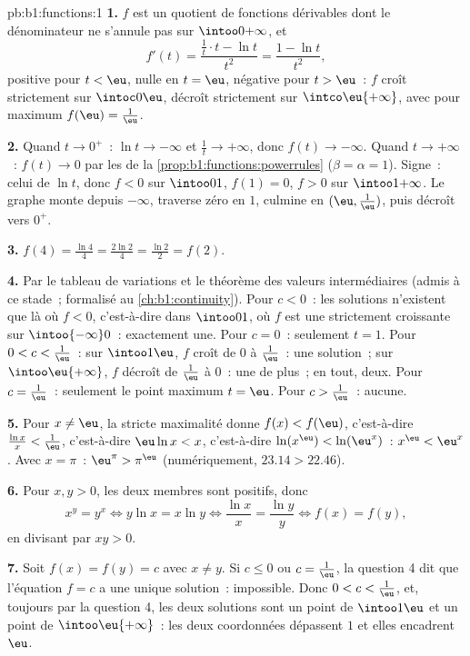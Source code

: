 \begin{solution}{pb:b1:functions:1}
\textbf{1.} $f$ est un quotient de fonctions dérivables dont le
dénominateur ne s'annule pas sur $\intoo0{+\infty}$, et
\[
f'(t) = \frac{\frac1t \cdot t - \ln t}{t^2} = \frac{1 - \ln
t}{t^2} ,
\]
positive pour $t < \eu$, nulle en $t = \eu$, négative pour $t > \eu$~:
$f$ croît strictement sur $\intoc0\eu$, décroît strictement sur
$\intco\eu{+\infty}$, avec pour maximum $f(\eu) = \frac1\eu$.

\textbf{2.} Quand $t \to 0^+$~: $\ln t \to -\infty$ et $\frac1t \to
+\infty$, donc $f(t) \to -\infty$. Quand $t \to +\infty$~: $f(t) \to
0$ par les  de la
\cref{prop:b1:functions:powerrules} ($\beta = \alpha = 1$). Signe~:
celui de $\ln t$, donc $f < 0$ sur $\intoo01$, $f(1) = 0$, $f > 0$ sur
$\intoo1{+\infty}$. Le graphe monte depuis $-\infty$, traverse zéro en
$1$, culmine en $(\eu, \frac1\eu)$, puis décroît vers $0^+$.

\textbf{3.} $f(4) = \frac{\ln 4}4 = \frac{2\ln 2}4 = \frac{\ln 2}2
= f(2)$.

\textbf{4.} Par le tableau de variations et le théorème des valeurs
intermédiaires (admis à ce stade~; formalisé au
\cref{ch:b1:continuity}). Pour $c < 0$~: les solutions n'existent que
là où $f < 0$, c'est-à-dire dans $\intoo01$, où $f$ est une 
strictement croissante sur $\intoo{-\infty}0$~: exactement une. Pour
$c = 0$~: seulement $t = 1$. Pour $0 < c < \frac1\eu$~: sur
$\intoo1\eu$, $f$ croît de $0$ à $\frac1\eu$~: une solution~; sur
$\intoo\eu{+\infty}$, $f$ décroît de $\frac1\eu$ à $0$~: une de plus~;
en tout, deux. Pour $c = \frac1\eu$~: seulement le point maximum
$t = \eu$. Pour $c > \frac1\eu$~: aucune.

\textbf{5.} Pour $x \neq \eu$, la stricte maximalité donne $f(x) <
f(\eu)$, c'est-à-dire $\frac{\ln x}x < \frac1\eu$, c'est-à-dire
$\eu\ln x < x$, c'est-à-dire $\ln(x^\eu) < \ln(\eu^x)$~: $x^\eu <
\eu^x$. Avec $x = \pi$~: $\eu^\pi > \pi^\eu$ (numériquement,
$23.14 > 22.46$).

\textbf{6.} Pour $x, y > 0$, les deux membres sont positifs, donc
\[
x^y = y^x \iff y\ln x = x\ln y \iff \frac{\ln x}x = \frac{\ln y}y
\iff f(x) = f(y) ,
\]
en divisant par $xy > 0$.

\textbf{7.} Soit $f(x) = f(y) = c$ avec $x \neq y$. Si $c \leq 0$ ou
$c = \frac1\eu$, la question 4 dit que l'équation $f = c$ a une unique
solution~: impossible. Donc $0 < c < \frac1\eu$, et, toujours par la
question 4, les deux solutions sont un point de $\intoo1\eu$ et un
point de $\intoo\eu{+\infty}$~: les deux coordonnées dépassent $1$ et
elles encadrent $\eu$.


\end{solution}
